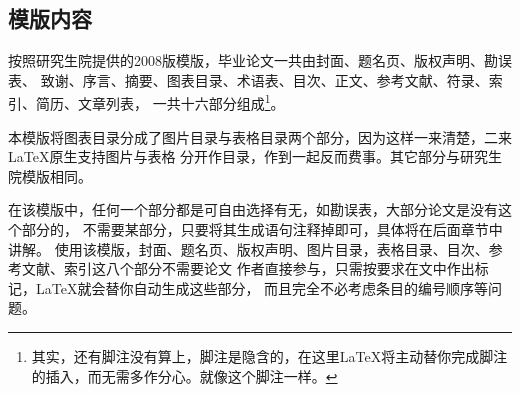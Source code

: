 \subsection{模版内容}

按照研究生院提供的2008版模版，毕业论文一共由封面、题名页、版权声明、勘误表、
致谢、序言、摘要、图表目录、术语表、目次、正文、参考文献、符录、索引、简历、文章列表，
一共十六部分组成\footnote{其实，还有脚注没有算上，脚注是隐含的，在这里\LaTeX{}将主动替你完成脚注的插入，而无需多作分心。就像这个脚注一样。}。

本模版将图表目录分成了图片目录与表格目录两个部分，因为这样一来清楚，二来\LaTeX{}原生支持图片与表格
分开作目录，作到一起反而费事。其它部分与研究生院模版相同。

在该模版中，任何一个部分都是可自由选择有无，如勘误表，大部分论文是没有这个部分的，
不需要某部分，只要将其生成语句注释掉即可，具体将在后面章节中讲解。
使用该模版，封面、题名页、版权声明、图片目录，表格目录、目次、参考文献、索引这八个部分不需要论文
作者直接参与，只需按要求在文中作出标记，\LaTeX{}就会替你自动生成这些部分，
而且完全不必考虑条目的编号顺序等问题。


